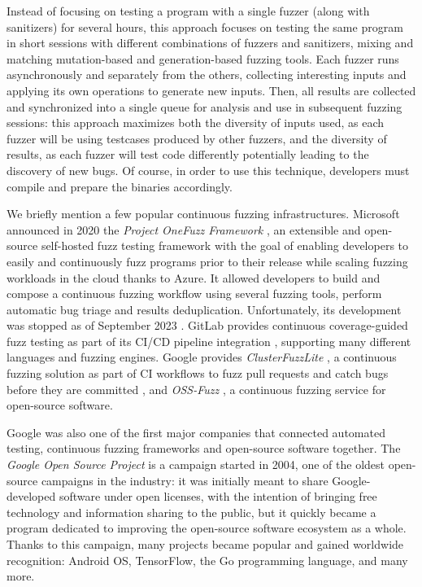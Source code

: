 Instead of focusing on testing a program with a single fuzzer (along with sanitizers) for several hours, this approach focuses on testing the same program in short sessions with different combinations of fuzzers and sanitizers, mixing and matching mutation-based and generation-based fuzzing tools. Each fuzzer runs asynchronously and separately from the others, collecting interesting inputs and applying its own operations to generate new inputs. Then, all results are collected and synchronized into a single queue for analysis and use in subsequent fuzzing sessions: this approach maximizes both the diversity of inputs used, as each fuzzer will be using testcases produced by other fuzzers, and the diversity of results, as each fuzzer will test code differently potentially leading to the discovery of new bugs. Of course, in order to use this technique, developers must compile and prepare the binaries accordingly.

\newpage
We briefly mention a few popular continuous fuzzing infrastructures. Microsoft announced in 2020 the \textit{Project OneFuzz Framework} \cite{onefuzz}, an extensible and open-source self-hosted fuzz testing framework with the goal of enabling developers to easily and continuously fuzz programs prior to their release while scaling fuzzing workloads in the cloud thanks to Azure. It allowed developers to build and compose a continuous fuzzing workflow using several fuzzing tools, perform automatic bug triage and results deduplication. Unfortunately, its development was stopped as of September 2023 \cite{onefuzz_repo}. GitLab provides continuous coverage-guided fuzz testing as part of its CI/CD pipeline integration \cite{gitlab_fuzz}, supporting many different languages and fuzzing engines. Google provides \textit{ClusterFuzzLite} \cite{google_lite_repo}, a continuous fuzzing solution as part of CI workflows to fuzz pull requests and catch bugs before they are committed \cite{google_lite}, and \textit{OSS-Fuzz} \cite{ossfuzz_paper}, a continuous fuzzing service for open-source software.

Google was also one of the first major companies that connected automated testing, continuous fuzzing frameworks and open-source software together. The \textit{Google Open Source Project} \cite{google_oss} is a campaign started in 2004, one of the oldest open-source campaigns in the industry: it was initially meant to share Google-developed software under open licenses, with the intention of bringing free technology and information sharing to the public, but it quickly became a program dedicated to improving the open-source software ecosystem as a whole. Thanks to this campaign, many projects became popular and gained worldwide recognition: Android OS, TensorFlow, the Go programming language, and many more.

